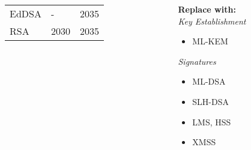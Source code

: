 \documentclass[
aspectratio=169, %
t, %
onlytextwidth, %
10pt, %
]{beamer}
\begin{document}
\begin{frame}
\begin{columns}
\begin{column}{0.58\linewidth}
\begin{table}[]
\begin{tabular}{|l|l|l|}
                    EdDSA & - & 2035 \\
                    RSA & 2030 & 2035 \\
                    \hline
                \end{tabular}
            \end{table}
        \end{column}
        \begin{column}{0.32\linewidth} %
            \newline
            \textbf{Replace with:}\\
            \textit{Key Establishment}
            \vspace{-1em}
            \begin{itemize}
                \item ML-KEM
            \end{itemize}
            \textit{Signatures}
            \vspace{-1em}
            \begin{itemize}
                \item ML-DSA
                \item SLH-DSA
                \item LMS, HSS
                \item XMSS
            \end{itemize}
        \end{column}
    \end{columns}
\end{frame}

\end{document}

